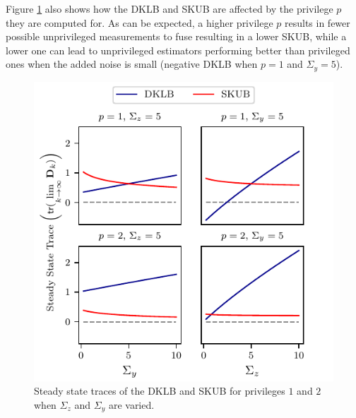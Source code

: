 \documentclass[conference]{IEEEtran}
\theoremstyle{definition}
\theoremstyle{remark}
\begin{document}
Figure \ref{fig:trace_params} also shows how the DKLB and SKUB are affected by the privilege $p$ they are computed for. As can be expected, a higher privilege $p$ results in fewer possible unprivileged measurements to fuse resulting in a lower SKUB, while a lower one can lead to unprivileged estimators performing better than privileged ones when the added noise is small (negative DKLB when $p=1$ and $\Sigma_y=5$).
\begin{figure}[htbp]
  \centering
  \includegraphics{figures/trace_params.pdf}
  \caption{Steady state traces of the DKLB and SKUB for privileges $1$ and $2$ when $\Sigma_z$ and $\Sigma_y$ are varied.}
  \label{fig:trace_params}
\end{figure}

% 
%                                               
%                                               
%                                               
% 
\end{document}
